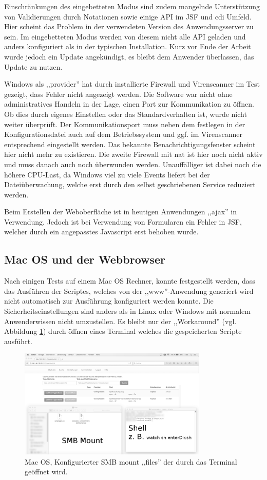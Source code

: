 \documentclass[oneside, ngerman, toc=bibliography,bibliography=totoc,listof=entryprefix, open=right,numbers=noenddot,fontsize=12pt]{scrbook}
\begin{document}
Einschränkungen des eingebetteten Modus sind zudem mangelnde Unterstützung von Validierungen durch Notationen sowie einige API im JSF und \acrshort{cdi} Umfeld.
Hier scheint das Problem in der verwendeten Version des Anwendungsserver zu sein. Im eingebetteten Modus werden von diesem nicht alle API geladen und anders konfiguriert als in der typischen Installation. Kurz vor Ende der Arbeit wurde jedoch ein Update angekündigt, es bleibt dem Anwender überlassen, das Update zu nutzen.


Windows als ,,provider'' hat durch installierte Firewall und Virenscanner im Test gezeigt, dass Fehler nicht angezeigt werden. Die Software war nicht ohne administratives Handeln in der Lage, einen Port zur Kommunikation zu öffnen. Ob dies durch eigenes Einstellen oder das Standardverhalten ist, wurde nicht weiter überprüft. Der Kommunikationsport muss neben dem festlegen in der Konfigurationsdatei auch auf dem Betriebssystem und ggf. im Virenscanner entsprechend eingestellt werden. Das bekannte Benachrichtigungsfenster scheint hier nicht mehr zu existieren. Die zweite Firewall mit  \acrshort{nat} ist hier noch nicht aktiv und muss danach auch noch überwunden werden. Unauffälliger ist dabei noch die höhere CPU-Last, da Windows viel zu viele Events liefert bei der Dateiüberwachung, welche erst durch den selbst geschriebenen Service reduziert werden.

Beim Erstellen der Weboberfläche ist in heutigen Anwendungen ,,ajax'' in Verwendung. Jedoch ist bei Verwendung von Formularen ein Fehler in JSF, welcher durch ein angepasstes Javascript erst behoben wurde. 


\subsection{Mac OS und der Webbrowser}
Nach einigen Tests auf einem Mac OS Rechner, konnte festgestellt werden, dass das Ausführen der Scriptes, welches von der ,,www''-Anwendung generiert wird nicht automatisch zur Ausführung konfiguriert werden konnte. Die Sicherheitseinstellungen sind anders als in Linux oder Windows mit normalem Anwenderwissen nicht umzustellen.
Es bleibt nur der ,,Workaround'' (vgl. Abbildung \ref{fig:apple}) durch öffnen eines Terminal welches die gespeicherten Scripte ausführt.
\begin{figure}[htbp] 
    \centering
    \includegraphics[width=0.8\textwidth]{Masterarbeit_Bilder/appel_terminal.png}
    \caption{Mac OS, Konfigurierter SMB mount ,,files'' der durch das Terminal geöffnet wird. }
    \label{fig:apple}
\end{figure}  
\end{document}
